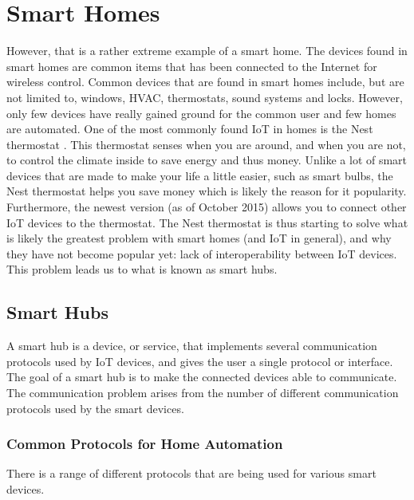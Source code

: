 \section{Smart Homes}\label{sec:smarthomes}
However, that is a rather extreme example of a smart home. 
The devices found in smart homes are common items that has been connected to the Internet for wireless control.
Common devices that are found in smart homes include, but are not limited to, 
windows, HVAC, thermostats, sound systems and locks. 
However, only few devices have really gained ground for the common user and few homes are automated.
One of the most commonly found IoT in homes is the Nest thermostat \cite{NEST}. 
This thermostat senses when you are around, and when you are not, 
to control the climate inside to save energy and thus money.
Unlike a lot of smart devices that are made to make your life a little easier, such as smart bulbs,
the Nest thermostat helps you save money which is likely the reason for it popularity. 
Furthermore, the newest version (as of October 2015) allows you to connect other IoT devices to the thermostat. 
The Nest thermostat is thus starting to solve what is likely the greatest problem with smart homes (and IoT in general), 
and why they have not become popular yet: lack of interoperability between IoT devices. 
This problem leads us to what is known as smart hubs. 

\subsection{Smart Hubs}
A smart hub is a device, or service, that implements several communication protocols used by IoT devices, 
and gives the user a single protocol or interface. 
The goal of a smart hub is to make the connected devices able to communicate.
The communication problem arises from the number of different communication protocols used by the smart devices. 


\subsubsection{Common Protocols for Home Automation}
There is a range of different protocols that are being used for various smart devices. 


